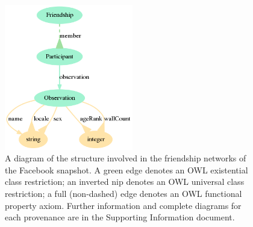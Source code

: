 \documentclass[review]{elsarticle}
\begin{document}
\begin{figure}[!ht]
    \centering
    \includegraphics[width=0.5\textwidth]{ontologies/facebook-legacy-AntonioAnzoategui18022013Friendship.ttl/draw}
    \caption{A diagram of the structure involved in the friendship networks
    of the Facebook snapshot. A green edge denotes an OWL existential class restriction; an inverted nip denotes an OWL universal class restriction; a full (non-dashed) edge denotes an OWL functional property axiom. Further information and complete diagrams for each provenance are in the Supporting Information document.}\label{dia}
\end{figure}
\end{document}
